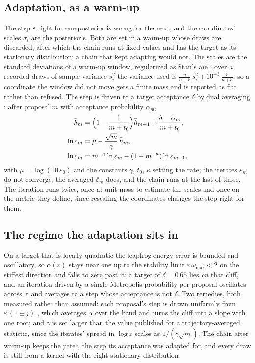 \documentclass[11pt,a4paper]{article}
\begin{document}
\subsection{Adaptation, as a warm-up}
The step $\varepsilon$ right for one posterior is wrong for the next, and the
coordinates' scales $\sigma_i$ are the posterior's. Both are set in a warm-up
whose draws are discarded, after which the chain runs at fixed values and has
the target as its stationary distribution; a chain that kept adapting would
not. The scales are the standard deviations of a warm-up window, regularized
as Stan's are \citep{stan_reference}: over $n$ recorded draws of sample
variance $s_i^2$ the variance used is
$\frac{n}{n+5}\,s_i^2 + 10^{-3}\,\frac{5}{n+5}$, so a coordinate the window
did not move gets a finite mass and is reported as flat rather than refused.
The
step is driven to a target acceptance $\delta$ by dual averaging
\citep[Sec.~3.2]{hoffman2014}: after proposal $m$ with acceptance probability
$\alpha_m$,
\begin{align}
  \bar h_m &= \Big(1 - \frac{1}{m + t_0}\Big)\bar h_{m-1}
             + \frac{\delta - \alpha_m}{m + t_0}, \notag \\
  \ln \varepsilon_m &= \mu - \frac{\sqrt{m}}{\gamma}\,\bar h_m, \notag \\
  \ln \bar\varepsilon_m &= m^{-\kappa}\ln \varepsilon_m
             + (1 - m^{-\kappa})\ln \bar\varepsilon_{m-1},
  \label{eq:dual-averaging}
\end{align}
with $\mu = \log(10\,\varepsilon_0)$ and the constants $\gamma$, $t_0$,
$\kappa$ setting the rate; the iterates $\varepsilon_m$ do not converge, the
averaged $\bar\varepsilon_m$ does, and the chain runs at the last of those. The
iteration runs twice, once at unit mass to estimate the scales and once on the
metric they define, since rescaling the coordinates changes the step right for
them.

\subsection{The regime the adaptation sits in}
On a target that is locally quadratic the leapfrog energy error is bounded
and oscillatory, so $\alpha(\varepsilon)$ stays near one up to the stability
limit $\varepsilon\,\omega_{\max} < 2$ on the stiffest direction and falls to
zero past it: a target of $\delta = 0.65$ lies \emph{on} that cliff, and an
iteration driven by a single Metropolis probability per proposal oscillates
across it and averages to a step whose acceptance is not $\delta$. Two
remedies, both measured rather than assumed: each proposal's step is drawn
uniformly from
$\bar\varepsilon\,(1 \pm j)$ \citep[Sec.~5.4.2.2]{neal2011}, which averages
$\alpha$ over the band and turns the cliff into a slope with one root; and
$\gamma$ is set larger than the value published for a trajectory-averaged
statistic, since the iterates' spread in $\log\varepsilon$ scales as
$1/(\gamma\sqrt{m})$. The chain after warm-up keeps the jitter, the step its
acceptance was adapted for, and every draw is still from a kernel with the
right stationary distribution.
\end{document}
